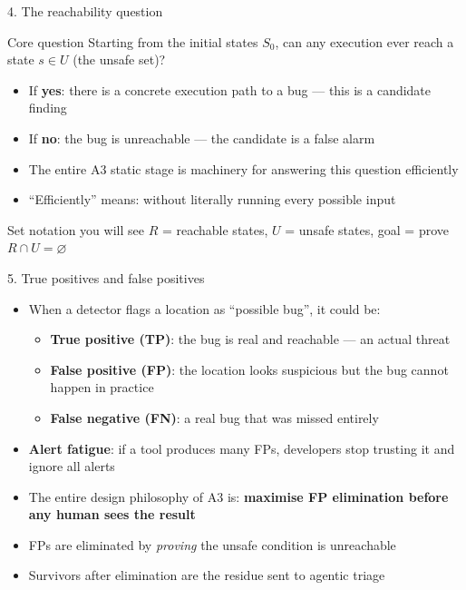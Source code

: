 \documentclass[aspectratio=169]{beamer}
\begin{document}
\begin{frame}{4. The reachability question}
\begin{block}{Core question}
Starting from the initial states \(S_0\), can any execution ever reach a state \(s \in U\) (the unsafe set)?
\end{block}
\begin{itemize}
  \item If \textbf{yes}: there is a concrete execution path to a bug --- this is a candidate finding
  \item If \textbf{no}: the bug is unreachable --- the candidate is a false alarm
  \item The entire A3 static stage is machinery for answering this question efficiently
  \item ``Efficiently'' means: without literally running every possible input
\end{itemize}
\begin{block}{Set notation you will see}
\(R\) = reachable states, \(U\) = unsafe states, goal = prove \(R \cap U = \varnothing\)
\end{block}
\end{frame}

\begin{frame}{5. True positives and false positives}
\begin{itemize}
  \item When a detector flags a location as ``possible bug'', it could be:
  \begin{itemize}
    \item \textbf{True positive (TP)}: the bug is real and reachable --- an actual threat
    \item \textbf{False positive (FP)}: the location looks suspicious but the bug cannot happen in practice
    \item \textbf{False negative (FN)}: a real bug that was missed entirely
  \end{itemize}
  \item \textbf{Alert fatigue}: if a tool produces many FPs, developers stop trusting it and ignore all alerts
  \item The entire design philosophy of A3 is: \textbf{maximise FP elimination before any human sees the result}
  \item FPs are eliminated by \emph{proving} the unsafe condition is unreachable
  \item Survivors after elimination are the residue sent to agentic triage
\end{itemize}
\end{frame}
\end{document}
